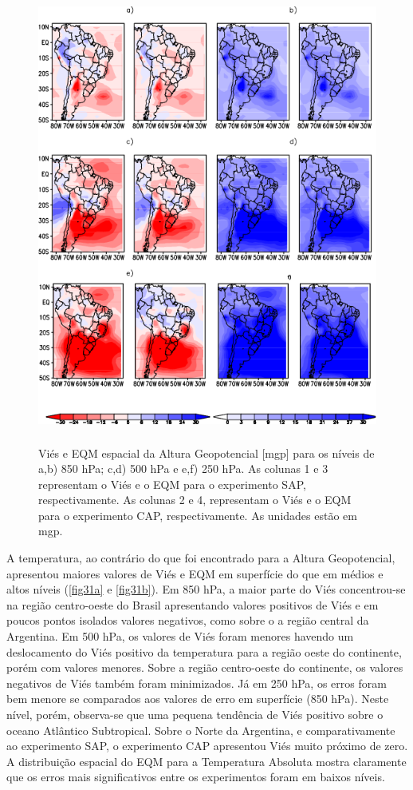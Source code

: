 \begin{figure}[!hbp]
\centering
\includegraphics[height=15cm]{./figs/campo_vies_eqm-zgeo.png}
\caption{Viés e EQM espacial da Altura Geopotencial [mgp] para os níveis de a,b) 850 hPa; c,d) 500 hPa e e,f) 250 hPa. As colunas 1 e 3 representam o Viés e o EQM para o experimento SAP, respectivamente. As colunas 2 e 4, representam o Viés e o EQM para o experimento CAP, respectivamente. As unidades estão em mgp.}
\label{fig30b}
\end{figure}

A temperatura, ao contrário do que foi encontrado para a Altura Geopotencial, apresentou maiores valores de Viés e EQM em superfície do que em médios e altos níveis (\autoref{fig31a} e \autoref{fig31b}). Em 850 hPa, a maior parte do Viés concentrou-se na região centro-oeste do Brasil apresentando valores positivos de Viés e em poucos pontos isolados valores negativos, como sobre o a região central da Argentina. Em 500 hPa, os valores de Viés foram menores havendo um deslocamento do Viés positivo da temperatura para a região oeste do continente, porém com valores menores. Sobre a região centro-oeste do continente, os valores negativos de Viés também foram minimizados. Já em 250 hPa, os erros foram bem menore se comparados aos valores de erro em superfície (850 hPa). Neste nível, porém, observa-se que uma pequena tendência de Viés positivo sobre o oceano Atlântico Subtropical. Sobre o Norte da Argentina, e comparativamente ao experimento SAP, o experimento CAP apresentou Viés muito próximo de zero. A distribuição espacial do EQM para a Temperatura Absoluta mostra claramente que os erros mais significativos entre os experimentos foram em baixos níveis.

